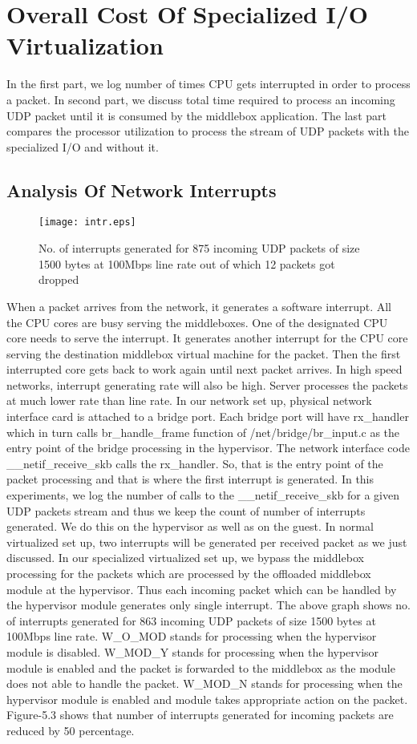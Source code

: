 \documentclass[a4paper,11pt]{report}
\begin{document}
\section{Overall Cost Of Specialized I/O Virtualization}
In the first part, we log number of times CPU gets interrupted in order to process a packet. In second part, we discuss total time required to process an incoming UDP packet until it is consumed by the middlebox application. The last part compares the processor utilization to process the stream of UDP packets with the specialized I/O and without it.  
\subsection{Analysis Of Network Interrupts}
\begin{figure}[h]
\centering
\texttt{[image: intr.eps]}
\caption{No. of interrupts generated for 875 incoming UDP packets of size 1500 bytes at 100Mbps line rate out of which 12 packets got dropped}
\end{figure}
When a packet arrives from the network, it generates a software interrupt. All the CPU cores are busy serving the middleboxes. One of the designated CPU core needs to serve the interrupt. It generates another interrupt for the CPU core serving the destination middlebox virtual machine for the packet. Then the first interrupted core gets back to work again until next packet arrives. In high speed networks, interrupt generating rate will also be high. Server processes the packets at much lower rate than line rate. In our network set up, physical network interface card is attached to a bridge port. Each bridge port will have rx\_handler which in turn calls br\_handle\_frame function of /net/bridge/br\_input.c as the entry point of the bridge processing in the hypervisor\cite{AL}. The network interface code \_\_netif\_receive\_skb calls the rx\_handler. So, that is the entry point of the packet processing and that is where the first interrupt is generated. In this experiments, we log the number of calls to the \_\_netif\_receive\_skb for a given UDP packets stream and thus we keep the count of number of interrupts generated. We do this on the hypervisor as well as on the guest. In normal virtualized set up, two interrupts will be generated per received packet as we just discussed. In our specialized virtualized set up, we bypass the middlebox processing for the packets which are processed by the offloaded middlebox module at the hypervisor. Thus each incoming packet which can be handled by the hypervisor module generates only single interrupt. The above graph shows no. of interrupts generated for 863 incoming UDP packets of size 1500 bytes at 100Mbps line rate. W\_O\_MOD stands for processing when the hypervisor module is disabled. W\_MOD\_Y stands for processing when the hypervisor module is enabled and the packet is forwarded to the middlebox as the module does not able to handle the packet. W\_MOD\_N stands for processing when the hypervisor module is enabled and module takes appropriate action on the packet. Figure-5.3 shows that number of interrupts generated for incoming packets are reduced by 50 percentage.        	    
\end{document}
